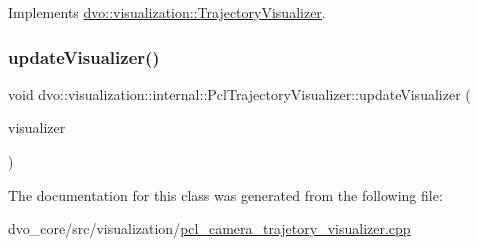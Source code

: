 Implements \mbox{\hyperlink{classdvo_1_1visualization_1_1_trajectory_visualizer_ac41106ae7e28c019b03f0aa210c6f0c1}{dvo\+::visualization\+::\+Trajectory\+Visualizer}}.

\mbox{\label{classdvo_1_1visualization_1_1internal_1_1_pcl_trajectory_visualizer_a16c8c79c3773408afba9ef57fcaea9e2}} 
\subsubsection{\texorpdfstring{update\+Visualizer()}{updateVisualizer()}}
{\footnotesize\ttfamily void dvo\+::visualization\+::internal\+::\+Pcl\+Trajectory\+Visualizer\+::update\+Visualizer (\begin{DoxyParamCaption}\item[{pcl\+::visualization\+::\+P\+C\+L\+Visualizer \&}]{visualizer }\end{DoxyParamCaption})\hspace{0.3cm}{\ttfamily [inline]}}



The documentation for this class was generated from the following file\+:\begin{DoxyCompactItemize}
\item 
dvo\+\_\+core/src/visualization/\mbox{\hyperlink{pcl__camera__trajetory__visualizer_8cpp}{pcl\+\_\+camera\+\_\+trajetory\+\_\+visualizer.\+cpp}}\end{DoxyCompactItemize}
